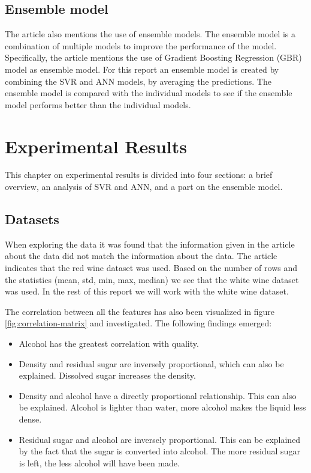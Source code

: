 \documentclass{article}
\begin{document}
\subsection{Ensemble model}
The article \cite{dahal2021prediction} also mentions the use of ensemble models.
The ensemble model is a combination of multiple models to improve the performance of the model.
Specifically, the article mentions the use of Gradient Boosting Regression (GBR) model as ensemble model.
For this report an ensemble model is created by combining the SVR and ANN models, by averaging the predictions.
The ensemble model is compared with the individual models to see if the ensemble model performs better than the individual models.

\section{Experimental Results}
This chapter on experimental results is divided into four sections: a brief overview, an analysis of SVR and ANN, and a part on the ensemble model.

\subsection{Datasets}
When exploring the data it was found that the information given in the article about the data did not match the information about the data.
The article indicates that the red wine dataset was used.
Based on the number of rows and the statistics (mean, std, min, max, median) we see that the white wine dataset was used.
In the rest of this report we will work with the white wine dataset.

The correlation between all the features has also been visualized in figure \autoref{fig:correlation-matrix} and investigated. The following findings emerged:
\begin{itemize}
	\item Alcohol has the greatest correlation with quality.
	\item Density and residual sugar are inversely proportional, which can also be explained. Dissolved sugar increases the density.
	\item Density and alcohol have a directly proportional relationship. This can also be explained. Alcohol is lighter than water, more alcohol makes the liquid less dense.
	\item Residual sugar and alcohol are inversely proportional. This can be explained by the fact that the sugar is converted into alcohol. The more residual sugar is left, the less alcohol will have been made.
\end{itemize}
\end{document}
